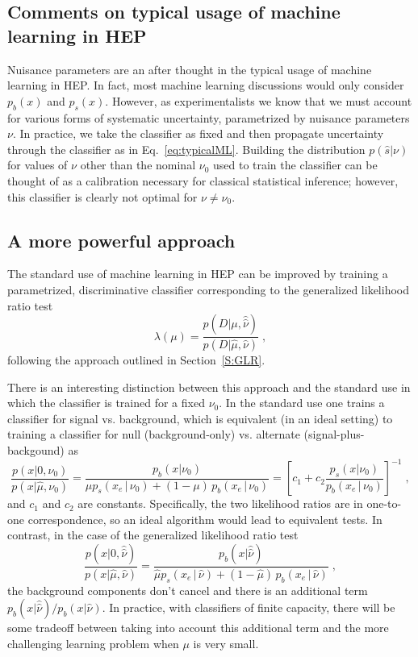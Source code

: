 \documentclass[11pt, oneside]{article}   	%
\begin{document}
\subsection{Comments on typical usage of machine learning in HEP}

Nuisance parameters are an after thought in the typical usage of machine learning in HEP. In fact, most machine learning discussions would only consider $p_b(x)$ and $p_s(x)$. However, as experimentalists we know that we must account for various forms of systematic uncertainty, parametrized by nuisance parameters $\nu$. In practice, we take the classifier as fixed and then propagate uncertainty through the classifier as in Eq.~\ref{eq:typicalML}. Building the distribution $p(\hat s|\nu)$ for values of $\nu$ other than the nominal $\nu_0$ used to train the classifier can be thought of as a calibration necessary for classical statistical inference; however, this classifier is clearly not optimal for $\nu \ne \nu_0$.

\subsection{A more powerful  approach}

The standard use of machine learning in HEP can be improved by training a parametrized, discriminative classifier corresponding to the generalized likelihood ratio test 
\begin{equation}
\lambda(\mu) = \frac{p(D|\mu, \hat{\hat{\nu}})}{p(D|\hat \mu, {\hat{\nu}})} \;,
\end{equation}
following the approach outlined in Section~\ref{S:GLR}. 

There is an interesting distinction between this approach and the standard use in which the classifier is trained for a fixed $\nu_0$. In the standard use one trains a classifier for signal vs. background, which is equivalent (in an ideal setting) to training a classifier for  null (background-only) vs. alternate (signal-plus-backgound) as 
\begin{equation}
 \frac{p(x| 0, \nu_0)}{p(x|\hat \mu, \nu_0)} =  \frac{p_b(x| \nu_0)}{ \mu p_s( x_e \, |\,  \nu_0)  + (1-\mu)\, p_b( x_e \,|\, \nu_0)} = \left[ c_1 + c_2   \frac{p_s(x| \nu_0)}{ p_b( x_e \,|\, \nu_0)} \right ]^{-1} \; ,
\end{equation}
and $c_1$ and $c_2$ are constants. Specifically, the two  likelihood ratios are in one-to-one correspondence, so an ideal algorithm would lead to equivalent tests. In contrast, in the case of the generalized likelihood ratio test 
\begin{equation}
 \frac{p(x| 0, \hat{\hat{ \nu}})}{p(x|\hat \mu, \hat\nu)} =  \frac{p_b(x| \hat{\hat{ \nu}})}{ \hat \mu p_s( x_e \, |\,  \hat\nu)  + (1- \hat \mu )\, p_b( x_e \,|\, \hat \nu)} \; ,
\end{equation}
the background components don't cancel and there is an additional term $p_b(x| \hat{\hat{ \nu}})/p_b(x| {\hat{ \nu}})$.
In practice, with classifiers of finite capacity, there will be some tradeoff between taking into account this additional term and the more challenging learning problem when $\mu$ is very small. 
\end{document}
